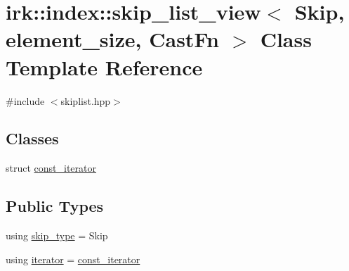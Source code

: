 \hypertarget{classirk_1_1index_1_1skip__list__view}{}\section{irk\+:\+:index\+:\+:skip\+\_\+list\+\_\+view$<$ Skip, element\+\_\+size, Cast\+Fn $>$ Class Template Reference}
\label{classirk_1_1index_1_1skip__list__view}


{\ttfamily \#include $<$skiplist.\+hpp$>$}

\subsection*{Classes}
\begin{DoxyCompactItemize}
\item 
struct \mbox{\hyperlink{structirk_1_1index_1_1skip__list__view_1_1const__iterator}{const\+\_\+iterator}}
\end{DoxyCompactItemize}
\subsection*{Public Types}
\begin{DoxyCompactItemize}
\item 
using \mbox{\hyperlink{classirk_1_1index_1_1skip__list__view_a7fa2224428803eee24062bb123978755}{skip\+\_\+type}} = Skip
\item 
using \mbox{\hyperlink{classirk_1_1index_1_1skip__list__view_a7e7a81a64ede6bcd7c49bc05cd6243d3}{iterator}} = \mbox{\hyperlink{structirk_1_1index_1_1skip__list__view_1_1const__iterator}{const\+\_\+iterator}}
\end{DoxyCompactItemize}
